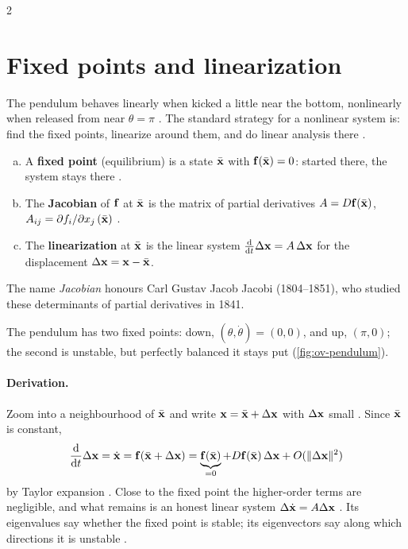 \begin{paracol}{2}
\section{Fixed points and linearization}\label{sec:fu-linearization}

The pendulum behaves linearly when kicked a little near the bottom, nonlinearly when released from
near $\theta=\pi$ . The standard strategy for a nonlinear system is:
find the fixed points, linearize around them, and do linear analysis there .

\begin{definition}\label{def:fu-fixed}
\begin{enumerate}[(a)]
  \item A \textbf{fixed point} (equilibrium) is a state $\bar{\mathbf{x}}$ with $\mathbf{f}(\bar{\mathbf{x}})=0$: started
        there, the system stays there .
  \item The \textbf{Jacobian} of $\mathbf{f}$ at $\bar{\mathbf{x}}$ is the matrix of partial derivatives
        $A=D\mathbf{f}(\bar{\mathbf{x}})$, $A_{ij}=\partial f_i/\partial x_j\,(\bar{\mathbf{x}})$ .
  \item The \textbf{linearization} at $\bar{\mathbf{x}}$ is the linear system
        $\frac{\mathrm d}{\mathrm dt}\Delta\mathbf{x}=A\,\Delta\mathbf{x}$ for the displacement
        $\Delta\mathbf{x}=\mathbf{x}-\bar{\mathbf{x}}$.
\end{enumerate}
The name \emph{Jacobian} honours Carl Gustav Jacob Jacobi (1804--1851), who studied these
determinants of partial derivatives in 1841.
\end{definition}

The pendulum has two fixed points: down, $(\theta,\dot\theta)=(0,0)$, and up, $(\pi,0)$; the second is
unstable, but perfectly balanced it stays put 
(\cref{fig:ov-pendulum}).

\paragraph{Derivation.} Zoom into a neighbourhood of $\bar{\mathbf{x}}$ and write
$\mathbf{x}=\bar{\mathbf{x}}+\Delta\mathbf{x}$ with $\Delta\mathbf{x}$ small . Since $\bar{\mathbf{x}}$ is
constant,
\begin{equation}\label{eq:fu-taylor}
  \frac{\mathrm d}{\mathrm dt}\Delta\mathbf{x}=\dot{\mathbf{x}}=\mathbf{f}(\bar{\mathbf{x}}+\Delta\mathbf{x})
  =\underbrace{\mathbf{f}(\bar{\mathbf{x}})}_{=0}+D\mathbf{f}(\bar{\mathbf{x}})\,\Delta\mathbf{x}+O(\lVert\Delta\mathbf{x}\rVert^2)
\end{equation}
by Taylor expansion . Close to the fixed point the higher-order terms are
negligible, and what remains is an honest linear system $\Delta\dot{\mathbf{x}}=A\Delta\mathbf{x}$
. Its eigenvalues say whether the fixed point is stable; its eigenvectors
say along which directions it is unstable .


\end{paracol}
